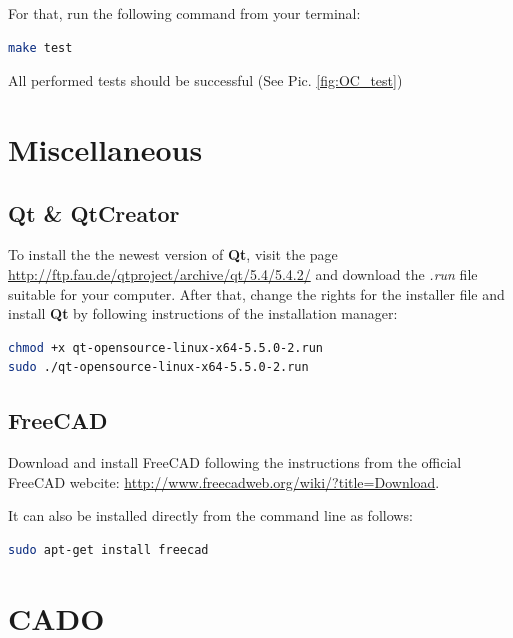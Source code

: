 \documentclass[11pt,a4paper,article,bibtotoc,idxtotoc,headsepline,footsepline,footexclude,DIV13,oneside]{scrbook}
\begin{document}
For that, run the following command from your terminal:
\begin{lstlisting}[language=bash]
make test
\end{lstlisting}
All performed tests should be successful (See Pic. \ref{fig:OC_test})

\chapter{Miscellaneous}
\section{Qt \& QtCreator}
\label{Qt}
To install the the newest version of \textbf{Qt}, visit the page \\ \href{http://ftp.fau.de/qtproject/archive/qt/5.4/5.4.2/}{http://ftp.fau.de/qtproject/archive/qt/5.4/5.4.2/} and download the \textit{.run} file suitable for your computer. 
After that, change the rights for the installer file and install \textbf{Qt} by following instructions of the installation manager:
\begin{lstlisting}[language=bash]
chmod +x qt-opensource-linux-x64-5.5.0-2.run
sudo ./qt-opensource-linux-x64-5.5.0-2.run
\end{lstlisting}
\section{FreeCAD}
Download and install FreeCAD following the instructions from the official FreeCAD webcite: \href{http://www.freecadweb.org/wiki/?title=Download}{http://www.freecadweb.org/wiki/?title=Download}.

It can also be installed directly from the command line as follows:
\begin{lstlisting}[language=bash]
sudo apt-get install freecad
\end{lstlisting}
\chapter{CADO}
\end{document}
